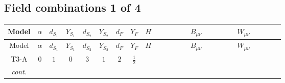 \documentclass[8pt]{article}
\begin{document}
\begin{landscape}
\subsection*{Field combinations 1 of 4}
\begin{longtable}{@{}cccccccc >{\raggedright\arraybackslash}p{0.21\linewidth} >{\raggedright\arraybackslash}p{0.21\linewidth} >{\raggedright\arraybackslash}p{0.21\linewidth}@{}}
\toprule
Model & $\alpha$ & $d_{S_1}$ & $Y_{S_1}$ & $d_{S_2}$ & $Y_{S_2}$ & $d_F$ & $Y_F$ & $H$ & $B_{\mu\nu}$ & $W_{\mu\nu}$ \\
\midrule
\endfirsthead
\toprule
Model & $\alpha$ & $d_{S_1}$ & $Y_{S_1}$ & $d_{S_2}$ & $Y_{S_2}$ & $d_F$ & $Y_F$ & $H$ & $B_{\mu\nu}$ & $W_{\mu\nu}$ \\
\midrule
\endhead
T3-A & $0$ & $1$ & $0$ & $3$ & $1$ & $2$ & $\frac{1}{2}$ & \scriptsize\adjustbox{max width=\linewidth}{$\begin{gathered} +\text{CH21} H_{a_1} H_{a_1}{}^{\dagger } \\ -H_{a_1} \mu ^2 H_{a_1}{}^{\dagger } \\ +\frac{2 \hbar  \overline{\lambda_5} H_{a_1} H_{a_2} \lambda_5 H_{a_1}{}^{\dagger } H_{a_2}{}^{\dagger }}{\sqrt{3} \epsilon }\end{gathered}$} & \scriptsize\adjustbox{max width=\linewidth}{$\begin{gathered} -\frac{3 \hbar  B_{\mu _1\mu _2}^2}{4 \epsilon } \\ -\frac{1}{4} \hbar  \log \left(\frac{\bar{\mu}^{2}}{m_2^2}\right) B_{\mu _1\mu _2}^2\end{gathered}$} & \scriptsize\adjustbox{max width=\linewidth}{$\begin{gathered} -\frac{2 \hbar  \left(W_{\mu _1\mu _2}^{A_1}\right){}^2}{3 \epsilon } \\ -\frac{1}{6} \hbar  \log \left(\frac{\bar{\mu}^{2}}{m_2^2}\right) \left(W_{\mu _1\mu _2}^{A_1}\right){}^2\end{gathered}$} \\
\textit{cont.} &  &  &  &  &  &  &  & \scriptsize\adjustbox{max width=\linewidth}{$\begin{gathered} +\frac{2 \hbar  \overline{\lambda_5} H_{a_1} H_{a_2} m_1^2 \lambda_5 H_{a_1}{}^{\dagger } H_{a_2}{}^{\dagger }}{\sqrt{3} \left(m_1^2-m_2^2\right)} \\ +\frac{2 \hbar  \log \left(\frac{\bar{\mu}^{2}}{m_1^2}\right) \overline{\lambda_5} H_{a_1} H_{a_2} m_1^2 \lambda_5 H_{a_1}{}^{\dagger } H_{a_2}{}^{\dagger }}{\sqrt{3} \left(m_1^2-m_2^2\right)} \\ -\frac{2 \hbar  \overline{\lambda_5} H_{a_1} H_{a_2} m_2^2 \lambda_5 H_{a_1}{}^{\dagger } H_{a_2}{}^{\dagger }}{\sqrt{3} \left(m_1^2-m_2^2\right)}\end{gathered}$} &  &  \\

\end{longtable}
\end{landscape}
\end{document}
